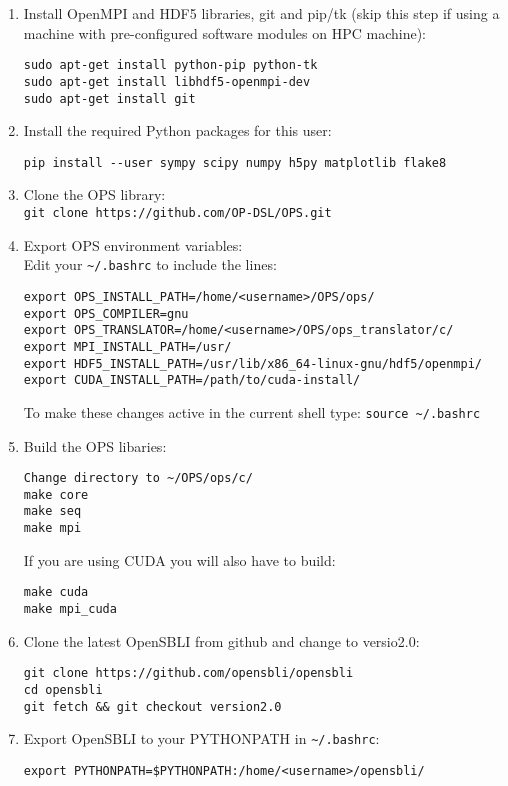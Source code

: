 \documentclass[11pt]{article}
\begin{document}
\begin{enumerate}
\item{Install OpenMPI and HDF5 libraries, git and pip/tk (skip this step if using a machine with pre-configured software modules on HPC machine):
\begin{verbatim}
sudo apt-get install python-pip python-tk
sudo apt-get install libhdf5-openmpi-dev
sudo apt-get install git
\end{verbatim}}
\item{Install the required Python packages for this user:}
\begin{verbatim}
pip install --user sympy scipy numpy h5py matplotlib flake8
\end{verbatim}
\item{Clone the OPS library:\\ \verb|git clone https://github.com/OP-DSL/OPS.git|}
\item{Export OPS environment variables:\\ Edit your \verb|~/.bashrc| to include the lines:}
\begin{verbatim}
export OPS_INSTALL_PATH=/home/<username>/OPS/ops/
export OPS_COMPILER=gnu
export OPS_TRANSLATOR=/home/<username>/OPS/ops_translator/c/
export MPI_INSTALL_PATH=/usr/
export HDF5_INSTALL_PATH=/usr/lib/x86_64-linux-gnu/hdf5/openmpi/
export CUDA_INSTALL_PATH=/path/to/cuda-install/
\end{verbatim}
To make these changes active in the current shell type: \verb|source ~/.bashrc|
\item{Build the OPS libaries:}
\begin{verbatim}
Change directory to ~/OPS/ops/c/
make core
make seq
make mpi
\end{verbatim}
If you are using CUDA you will also have to build:
\begin{verbatim}
make cuda
make mpi_cuda
\end{verbatim}

\item{Clone the latest OpenSBLI from github and change to versio2.0:}
\begin{verbatim}
git clone https://github.com/opensbli/opensbli
cd opensbli
git fetch && git checkout version2.0
\end{verbatim}

\item{Export OpenSBLI to your PYTHONPATH in \verb|~/.bashrc|:}
\begin{verbatim}
export PYTHONPATH=$PYTHONPATH:/home/<username>/opensbli/
\end{verbatim}


\end{enumerate}
\end{document}
